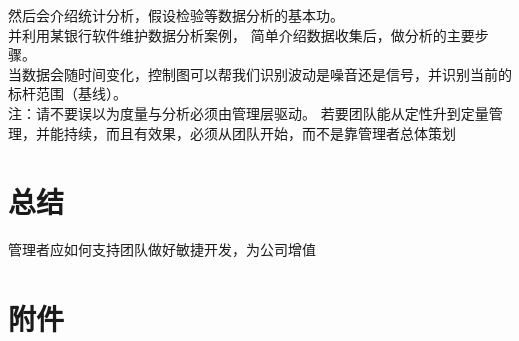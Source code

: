 \documentclass{book}        %
\begin{document}
然后会介绍统计分析，假设检验等数据分析的基本功。\\

并利用某银行软件维护数据分析案例， 简单介绍数据收集后，做分析的主要步骤。\\

当数据会随时间变化，控制图可以帮我们识别波动是噪音还是信号，并识别当前的标杆范围（基线）。\\

注：请不要误以为度量与分析必须由管理层驱动。 若要团队能从定性升到定量管理，并能持续，而且有效果，必须从团队开始，而不是靠管理者总体策划 \\










\part{总结} 管理者应如何支持团队做好敏捷开发，为公司增值\\





\part{附件}




\end{document}
